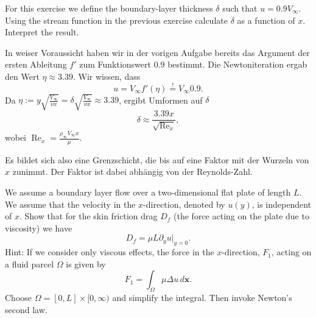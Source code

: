 \documentclass[12pt]{exam}
\newcommand{\del}{\partial}
\begin{document}
\begin{questions}
    
    \question For this exercise we define the boundary-layer thickness $\delta$ such that $u = 0.9 V_{\infty}$. Using the stream function in the previous exercise calculate $\delta$ as a function of $x$. Interpret the result.
    
    \begin{solution}
        In weiser Voraussicht haben wir in der vorigen Aufgabe bereits das Argument der ersten Ableitung $f'$ zum Funktionswert $0.9$ bestimmt. Die Newtoniteration ergab den Wert $\eta \approx 3.39$. Wir wissen, dass 
        \begin{equation*}
            u = V_{\infty} f'(\eta) \overset{!}{=} V_{\infty} 0.9.
        \end{equation*}
        Da $\eta := y \sqrt{\frac{V_{\infty}}{\nu x}} = \delta \sqrt{\frac{V_{\infty}}{\nu x}} \approx 3.39 $, ergibt Umformen auf $\delta$
        \begin{equation*}
            \delta \approx \frac{3.39 x}{\sqrt{\operatorname{Re}_x}},
        \end{equation*}
        wobei $\operatorname{Re}_x = \frac{\rho_{\infty} V_{\infty} x}{\mu}$.
        
        Es bildet sich also eine Grenzschicht, die bis auf eine Faktor mit der Wurzeln von $x$ zunimmt. Der Faktor ist dabei abhängig von der Reynolds-Zahl.
    \end{solution}
    
    
    \question We assume a boundary layer flow over a two-dimensional flat plate of length $L$. We assume that the velocity in the $x$-direction, denoted by $u(y)$, is independent of $x$. Show that for the skin friction drag $D_f$ (the force acting on the plate due to viscosity) we have
    \begin{equation*}
        D_f = \mu L \del_y u \vert_{y=0}.
    \end{equation*}
    Hint: If we consider only viscous effects, the force in the $x$-direction, $F_1$, acting on a fluid parcel $\Omega$ is given by
    \begin{equation*}
        F_1 = \int_\Omega \mu \Delta u \, d \mathbf{x}.
    \end{equation*}
    Choose $\Omega = [0, L] \times [0, \infty)$ and simplify the integral. Then invoke Newton's second law.
    

\end{questions}
\end{document}
